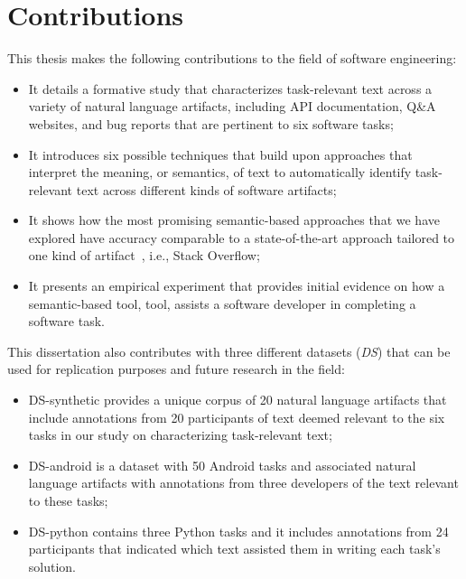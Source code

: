 

\section{Contributions}
\label{cp1:contributions}

This thesis makes the following contributions to the field of software engineering: 




\begin{itemize}

    \item It details a formative study that characterizes task-relevant text across a variety of natural language artifacts, including  API documentation, Q\&A websites, and
    bug reports that are pertinent to six software tasks; 

    \item It introduces six possible techniques that build upon approaches that interpret the meaning, or semantics, of text
    to automatically identify task-relevant text across different kinds of software artifacts;


    \item It shows how the most promising semantic-based approaches that we have explored have accuracy comparable to a state-of-the-art approach
    tailored to one kind of artifact~\cite{Xu2017}, i.e., Stack Overflow;

    \item It presents an empirical experiment that provides initial evidence on how  
    a semantic-based tool, \acs{tool}, assists a software developer in completing a software task. 
\end{itemize}





This dissertation also contributes with three different datasets ({\small \textit{DS}}) that can be used for replication purposes and future research in the field:
    
\begin{itemize}
    \item \acs{DS-synthetic} provides a unique corpus of 20 natural language artifacts that include annotations from 20 participants of text deemed relevant to 
    the six tasks in our study on characterizing task-relevant text;
    
    \item \acs{DS-android} is a dataset with 50 Android tasks     
    and associated natural language artifacts 
    with annotations from three developers of the text relevant to these tasks;

    \item \acs{DS-python} contains three Python tasks and it includes annotations from 24 participants that indicated which
    text assisted them in writing each task's solution.
\end{itemize}